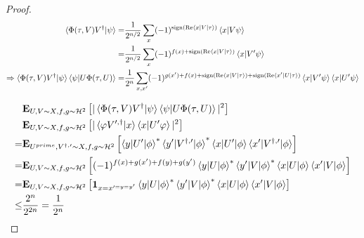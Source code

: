 \documentclass[manuscript,screen,review]{acmart}
\begin{document}
\begin{proof}
 
  \begin{equation*}
    \begin{split}
       \braket{\Phi(\tau,V) V^{\dagger}|\psi} = & \frac{1}{2^{n/2}}\sum_{x} (-1)^{\sign( \Rea \braket{x|V|\tau})}\braket{x |V \psi} \\
       = & \frac{1}{2^{n/2}}\sum_{x} (-1)^{ f(x) + \sign( \Rea \braket{x|V|\tau})}\braket{x |V^{\prime} \psi} \\
       \Rightarrow\braket{\Phi(\tau,V) V^{\dagger}|\psi}\braket{\psi|U\Phi(\tau,U) } = &\frac{1}{2^{n}}\sum_{x,x^{\prime}} (-1)^{ g(x^{\prime})+f(x) + \sign( \Rea \braket{x|V|\tau})+\sign( \Rea \braket{x^{\prime}|U|\tau})}\braket{x |V^{\prime} \psi} \braket{x |U^{\prime} \psi} 
    \end{split}
  \end{equation*}

  \begin{equation*}
    \begin{split}
& \exppm{ |\braket{\Phi(\tau,V) V^{\dagger}|\psi}\braket{\psi|U\Phi(\tau,U)}|^{2} }{U,V \sim X , f,g\sim \mathcal{H}^2} \\  
      & \exppm{ |\braket{\varphi V^{\prime, \dagger}|x}\braket{x|U^{\prime}\varphi}|^{2} }{U,V \sim X , f,g\sim \mathcal{H}^2}  \\ 
= & \exppm{ \braket{y|U^{\prime}|\phi}^{*} \braket{y^{\prime}|V^{\dagger, \prime}|\phi}^{*} \braket{x|U^{\prime}|\phi} \braket{x^{\prime}|V^{\dagger, \prime}|\phi}}{ U^{prime},V^{\dagger, \prime} \sim X , f,g\sim \mathcal{H}^2} \\
= & \exppm{ (-1)^{f(x)+g(x^{\prime})+f(y)+g(y^{\prime})} \braket{y|U|\phi}^{*} \braket{y^{\prime}|V|\phi}^{*} \braket{x|U|\phi} \braket{x^{\prime}|V|\phi}}{ U,V \sim X , f,g\sim \mathcal{H}^2} \\
= & \exppm{ \mathbf{1}_{x=x^{\prime=y=y^{\prime}}} \braket{y|U|\phi}^{*} \braket{y^{\prime}|V|\phi}^{*} \braket{x|U|\phi} \braket{x^{\prime}|V|\phi}}{ U,V \sim X , f,g\sim \mathcal{H}^2} \\
\le &\frac{2^{n}}{2^{2n}} = \frac{1}{2^n}
    \end{split}
  \end{equation*}


\end{proof}
\end{document}

